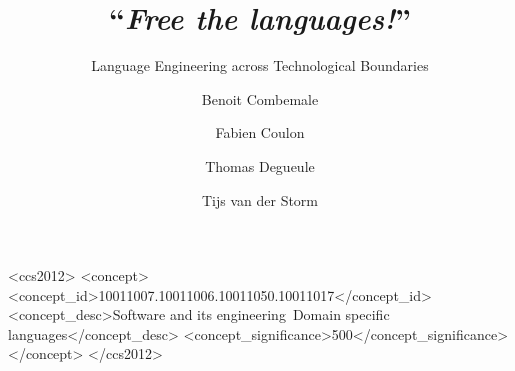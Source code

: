 \documentclass[sigplan]{acmart}
\begin{document}
\title{``\emph{Free the languages!}''}
\subtitle{Language Engineering across Technological Boundaries}

\author{Benoit Combemale}

\author{Fabien Coulon}

\author{Thomas Degueule}

\author{Tijs van der Storm}




%
%
 \begin{CCSXML}
	<ccs2012>
	<concept>
	<concept_id>10011007.10011006.10011050.10011017</concept_id>
	<concept_desc>Software and its engineering~Domain specific languages</concept_desc>
	<concept_significance>500</concept_significance>
	</concept>
	</ccs2012>
\end{CCSXML}




\maketitle






\clearpage
\balance


\end{document}
